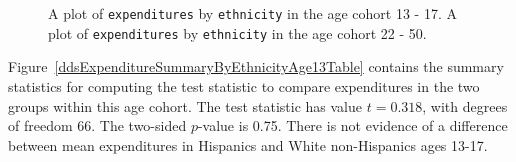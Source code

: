 \begin{figure}[h]
	\centering
	\caption{A plot of \texttt{expenditures} by \texttt{ethnicity} in the age cohort 13 - 17.   A plot of \texttt{expenditures} by \texttt{ethnicity} in the age cohort 22 - 50.}
	\label{ddsExpEthnicityAge}
\end{figure}

\textD{\newpage}

Figure~\ref{ddsExpenditureSummaryByEthnicityAge13Table} contains the summary statistics for computing the test statistic to compare expenditures in the two groups within this age cohort.  The test statistic has value $t = 0.318$, with degrees of freedom 66. The two-sided $p$-value is 0.75. There is not evidence of a difference between mean expenditures in Hispanics and White non-Hispanics ages 13-17.

